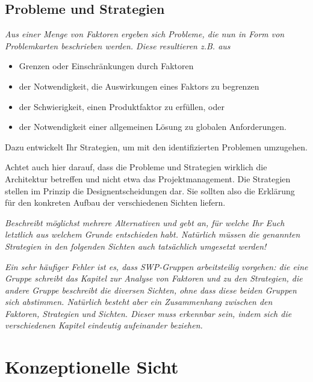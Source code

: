 \documentclass[fontsize=12pt,paper=a4,twoside]{scrartcl}
\begin{document}
\newpage
\subsection{Probleme und Strategien}
\label{sec:strategien}

{\it Aus einer Menge von Faktoren ergeben sich Probleme, die nun in
  Form von Problemkarten beschrieben werden. Diese resultieren
  z.B. aus
  \begin{itemize}
  \item Grenzen oder Einschränkungen durch Faktoren
  \item der Notwendigkeit, die Auswirkungen eines Faktors zu begrenzen
  \item der Schwierigkeit, einen Produktfaktor zu erfüllen, oder
  \item der Notwendigkeit einer allgemeinen Lösung zu globalen
    Anforderungen.
  \end{itemize}
  Dazu entwickelt Ihr Strategien, um mit den identifizierten Problemen
  umzugehen.

  Achtet auch hier darauf, dass die Probleme und Strategien wirklich
  die Architektur betreffen und nicht etwa das Projektmanagement. Die
  Strategien stellen im Prinzip die Designentscheidungen dar. Sie
  sollten also die Erklärung für den konkreten Aufbau der
  verschiedenen Sichten liefern.}


\textit{Beschreibt möglichst mehrere Alternativen und gebt
  an, für welche Ihr Euch letztlich aus welchem Grunde entschieden
  habt. Natürlich müssen die genannten Strategien in den folgenden
  Sichten auch tatsächlich umgesetzt werden!}

\textit{Ein sehr häufiger Fehler ist es, dass SWP-Gruppen
  arbeitsteilig vorgehen: die eine Gruppe schreibt das Kapitel zur
  Analyse von Faktoren und zu den Strategien, die andere Gruppe
  beschreibt die diversen Sichten, ohne dass diese beiden Gruppen sich
  abstimmen. Natürlich besteht aber ein Zusammenhang zwischen den
  Faktoren, Strategien und Sichten. Dieser muss erkennbar sein, indem
  sich die verschiedenen Kapitel eindeutig aufeinander beziehen.}

\section{Konzeptionelle Sicht}
\label{sec:konzeptionell}
\end{document}
